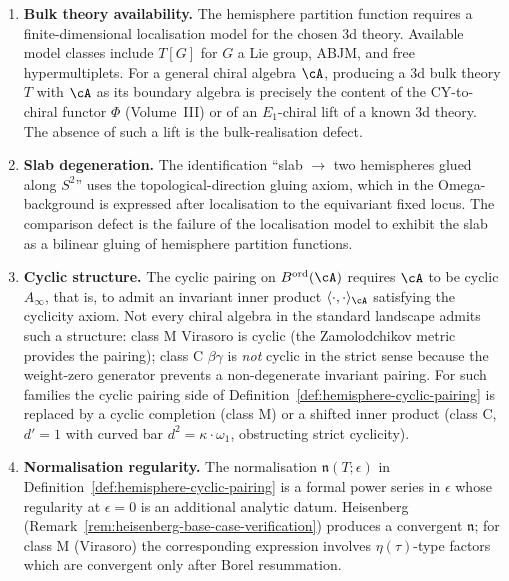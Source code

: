 \begin{remark}
\label{rem:hemisphere-cyclic-obstructions}
\leavevmode
\begin{enumerate}[leftmargin=2em,label=(\roman*)]
\item \textbf{Bulk theory availability.} The hemisphere
partition function requires a finite-dimensional localisation
model for the chosen $3$d theory. Available model classes include
$T[G]$ for $G$ a Lie group, ABJM, and free hypermultiplets. For a general chiral
algebra $\cA$, producing a $3$d bulk theory $T$ with $\cA$ as its
boundary algebra is precisely the content of the CY-to-chiral
functor $\Phi$ (Volume~III) or of an $E_1$-chiral lift
of a known $3$d theory. The absence of such a lift is the
bulk-realisation defect.
\item \textbf{Slab degeneration.} The identification
``slab $\to$ two hemispheres glued along $S^2$'' uses the
topological-direction gluing axiom, which in the
Omega-background is expressed after localisation to the
equivariant fixed locus. The comparison defect is the failure of
the localisation model to exhibit the slab as a bilinear gluing of
hemisphere partition functions.
\item \textbf{Cyclic structure.} The cyclic pairing on
$B^{\mathrm{ord}}(\cA)$ requires $\cA$ to be cyclic $A_\infty$,
that is, to admit an invariant inner product
$\langle\cdot,\cdot\rangle_\cA$ satisfying the cyclicity axiom.
Not every chiral algebra in the standard landscape admits such a
structure: class M Virasoro is cyclic (the Zamolodchikov metric
provides the pairing); class C $\beta\gamma$ is \emph{not}
cyclic in the strict sense because the weight-zero generator
prevents a non-degenerate invariant pairing. For such families
the cyclic pairing side of
Definition~\ref{def:hemisphere-cyclic-pairing} is replaced
by a cyclic completion (class M) or a shifted inner product
(class C, $d'=1$ with curved bar $d^2=\kappa\cdot\omega_1$,
obstructing strict cyclicity).
\item \textbf{Normalisation regularity.} The normalisation
$\mathfrak n(T;\epsilon)$ in
Definition~\ref{def:hemisphere-cyclic-pairing} is a formal
power series in $\epsilon$ whose regularity at $\epsilon=0$ is
an additional analytic datum. Heisenberg
(Remark~\ref{rem:heisenberg-base-case-verification}) produces a
convergent $\mathfrak n$; for class M (Virasoro)
the corresponding expression involves $\eta(\tau)$-type factors which
are convergent only after Borel resummation.
\end{enumerate}
\end{remark}

